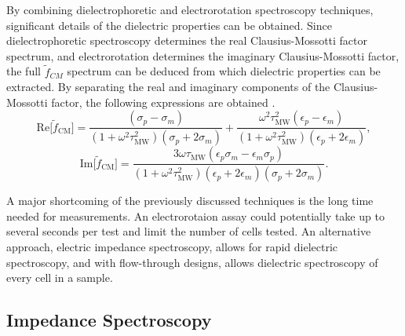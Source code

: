  \par By combining dielectrophoretic and electrorotation spectroscopy techniques, significant details of the dielectric properties can be obtained. Since dielectrophoretic spectroscopy determines the real Clausius-Mossotti factor spectrum, and electrorotation determines the imaginary Clausius-Mossotti factor, the full $\tilde{f}_{CM}$ spectrum can be deduced from which dielectric properties can be extracted. By separating the real and imaginary components of the Clausius-Mossotti factor, the following expressions are obtained \cite{hober_zweites_1912, morgan_single_2007}.
 \begin{equation}
     \text{Re}\big[\tilde{f}_{\text{CM}}\big] = \frac{(\sigma_p - \sigma_m)}{(1+\omega^2\tau_{\text{MW}}^2)(\sigma_p + 2\sigma_m)} + \frac{\omega^2\tau^2_{\text{MW}}(\epsilon_p-\epsilon_m)}{(1+\omega^2\tau_{\text{MW}}^2)(\epsilon_p+2\epsilon_m)},
 \end{equation}
 \begin{equation}
     \text{Im}\big[\tilde{f}_{\text{CM}} \big] = \frac{3\omega\tau_{\text{MW}}(\epsilon_p\sigma_m-\epsilon_m\sigma_p)}{(1+\omega^2\tau^2_{\text{MW}})(\epsilon_p+2\epsilon_m)(\sigma_p+2\sigma_m)}.
 \end{equation}
 \par A major shortcoming of the previously discussed techniques is the long time needed for measurements. An electrorotaion assay could potentially take up to several seconds per test and limit the number of cells tested. An alternative approach, electric impedance spectroscopy, allows for rapid dielectric spectroscopy, and with flow-through designs, allows dielectric spectroscopy of every cell in a sample. 
 
 \subsection{Impedance Spectroscopy}
 \label{sec:impedance_spectroscopy}
